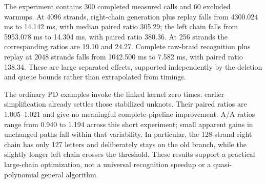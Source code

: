 The experiment contains 300 completed measured calls and 60 excluded warmups.
At 4096 strands, right-chain generation plus replay falls from 4300.024 ms
to 14.142 ms, with median paired ratio 305.29; the left chain falls from
5953.078 ms to 14.304 ms, with paired ratio 380.36. At 256 strands the
corresponding ratios are 19.10 and 24.27. Complete raw-braid recognition
plus replay at 2048 strands falls from 1042.500 ms to 7.582 ms, with paired
ratio 138.34. These are large separated effects, supported independently
by the deletion and queue bounds rather than extrapolated from timings.



The ordinary PD examples invoke the linked kernel zero times: earlier
simplification already settles those stabilized unknots. Their paired ratios
are 1.005--1.021 and give no meaningful complete-pipeline improvement.
A/A ratios range from 0.940 to 1.194 across this short experiment; small
apparent gains in unchanged paths fall within that variability. In particular,
the 128-strand right chain has only 127 letters and deliberately stays on the
old branch, while the slightly longer left chain crosses the threshold.
These results support a practical large-chain optimization, not a universal
recognition speedup or a quasi-polynomial general algorithm.
